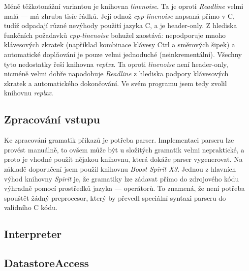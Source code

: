 \documentclass[thesis=B,czech]{FITthesis}[2019/03/06]
\newcommand{\Rplus}{\protect\hspace{-.1em}\protect\raisebox{.35ex}{\smaller{\smaller\textbf{+}}}}
\newcommand{\Cpp}{\mbox{C\Rplus\Rplus}\xspace}
\begin{document}
Méně těžkotonážní variantou je knihovna \textit{linenoise}. Ta je oproti \textit{Readline} velmi malá --- má zhruba tisíc řádků. Její odnož \textit{cpp-linenoise} napsaná přímo v \Cpp{}, tudíž odpadají různé nevýhody použití jazyka C, a je header-only. Z hlediska funkčních požadavků \textit{cpp-linenoise} bohužel zaostává: nepodporuje mnoho klávesových zkratek (například kombinace klávesy Ctrl a směrových šipek) a automatické doplňování je pouze velmi jednoduché (neinkrementální).  Všechny tyto nedostatky řeší knihovna \textit{replxx}. Ta oproti \textit{linenoise} není header-only, nicméně velmi dobře napodobuje \textit{Readline} z hlediska podpory klávesových zkratek a automatického dokončování. Ve svém programu jsem tedy zvolil knihovnu \textit{replxx}.


\subsection{Zpracování vstupu}

Ke zpracování gramatik příkazů je potřeba parser. Implementaci parseru lze provést manuálně, to ovšem může být u složitých gramatik velmi nepraktické, a proto je vhodné použít nějakou knihovnu, která dokáže parser vygenerovat. Na základě doporučení  jsem použil knihovnu \textit{Boost Spirit X3}. Jednou z hlavních výhod knihovny \textit{Spirit} je, že gramatiky lze zádavat přímo do zdrojového kódu výhradně pomocí prostředků jazyka --- operátorů. To znamená, že není potřeba spouštět žádný preprocesor, který by převedl speciální syntaxi parseru do validního \Cpp{} kódu.



\subsection{Interpreter}

\subsection{DatastoreAccess}
\end{document}
